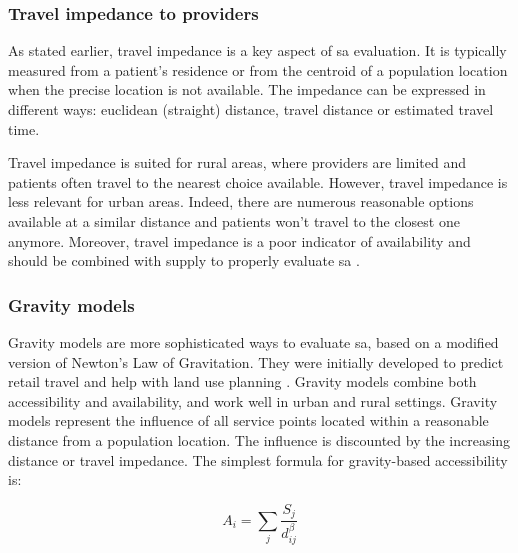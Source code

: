 \subsubsection{Travel impedance to providers}

As stated earlier, travel impedance is a key aspect of \ac{sa} evaluation. It is
typically measured from a patient's residence or from the centroid of a
population location when the precise location is not available. The impedance
can be expressed in different ways: euclidean (straight) distance, travel
distance or estimated travel time.

Travel impedance is suited for rural areas, where providers are limited and
patients often travel to the nearest choice available. However, travel impedance
is less relevant for urban areas. Indeed, there are numerous reasonable options
available at a similar distance and patients won't travel to the closest one
anymore. Moreover, travel impedance is a poor indicator of availability and
should be combined with supply to properly evaluate \ac{sa}
\cite{fryer_multi-method_1999}.

\subsubsection{Gravity models}

Gravity models are more sophisticated ways to evaluate \ac{sa}, based on a
modified version of Newton's Law of Gravitation. They were initially developed
to predict retail travel \cite{reilly_law_1931} and help with land use planning
\cite{hansen_how_1959}. Gravity models combine both accessibility and
availability, and work well in urban and rural settings. Gravity models
represent the influence of all service points located within a reasonable
distance from a population location. The influence is discounted by the
increasing distance or travel impedance. The simplest formula for gravity-based
accessibility is:

\begin{equation}
    A_i = \sum_j \frac{S_j}{d_{ij}^{\beta}}
\end{equation}

